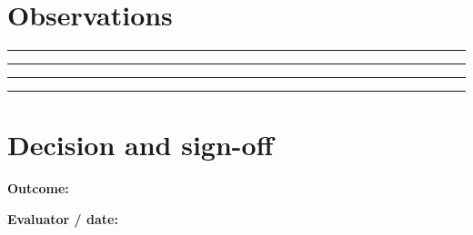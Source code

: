 \documentclass[10pt,letterpaper]{article}
\begin{document}
\section{Observations}
\noindent\rule{\linewidth}{0.4pt}\par\vspace{18pt}\noindent\rule{\linewidth}{0.4pt}\par\vspace{18pt}\noindent\rule{\linewidth}{0.4pt}\par\vspace{18pt}\noindent\rule{\linewidth}{0.4pt}\par\vspace{18pt}\section{Decision and sign-off}
\noindent\textbf{Outcome:}\quad\hrulefill\par\vspace{16pt}\noindent\textbf{Evaluator / date:}\quad\hrulefill\par
\end{document}
